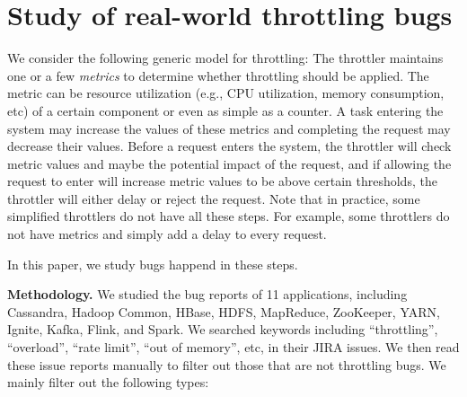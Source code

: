 \section{Study of real-world throttling bugs}

We consider the following generic model for throttling: The throttler maintains one or a few \emph{metrics}
to determine whether throttling should be applied. The metric can be resource utilization (e.g., CPU utilization, memory consumption, etc) 
of a certain component or even as simple as a counter. A task entering the system may increase the values
of these metrics and completing the request may decrease their values. Before a request enters the system,
the throttler will check metric values and maybe the potential impact of the request, and if allowing the request
to enter will increase metric values to be above certain thresholds, the throttler will either delay or reject the
request. Note that in practice, some simplified throttlers do not have all these steps. For example, some throttlers do not
have metrics and simply add a delay to every request.

In this paper, we study bugs happend in these steps.

\vspace{.1in}
\noindent
\textbf{Methodology.} We studied the bug reports of 11 applications, including Cassandra, Hadoop Common, 
HBase, HDFS, MapReduce, ZooKeeper, YARN, Ignite, Kafka, Flink, and Spark. We searched keywords including ``throttling'', ``overload'',
``rate limit'', ``out of memory'', etc, in their JIRA issues. We then read these issue reports manually to filter out those
that are not throttling bugs. We mainly filter out the following types:

